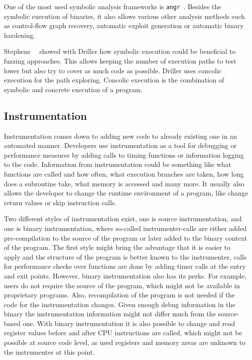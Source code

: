 One of the most used symbolic analysis frameworks is
\texttt{angr}~\cite{angrpaper}. Besides the symbolic execution of binaries, it
also allows various other analysis methods such as control-flow graph recovery,
automatic exploit generation or automatic binary hardening.

Stephens~\etal~\cite{driller} showed with Driller how symbolic execution could
be beneficial to fuzzing approaches. This allows keeping the number of execution
paths to test lower but also try to cover as much code as possible. Driller uses
concolic execution for the path exploring. Concolic execution is the combination
of symbolic and concrete execution of a program.

\subsection{Instrumentation}

Instrumentation comes down to adding new code to already existing one in an
automated manner. Developers use instrumentation as a tool for debugging or
performance measures by adding calls to timing functions or information logging
to the code. Information from instrumentation could be something like what
functions are called and how often, what execution branches are taken, how long
does a subroutine take, what memory is accessed and many more. It usually also
allows the developer to change the runtime environment of a program, like change
return values or skip instruction calls.

Two different styles of instrumentation exist, one is source instrumentation,
and one is binary instrumentation, where so-called instrumenter-calls are either
added pre-compilation to the source of the program or later added to the binary
context of the program. The first style might bring the advantage that it is
easier to apply and the structure of the program is better known to the
instrumenter, calls for performance checks over functions are done by adding
timer calls at the entry and exit points. However, binary instrumentation also
has its perks. For example, users do not require the source of the program,
which might not be available in proprietary programs. Also, recompilation of the
program is not needed if the code for the instrumentation changes. Given enough
debug information in the binary the instrumentation information might not differ
much from the source-based one. With binary instrumentation it is also possible
to change and read register values before and after CPU instructions are called,
which might not be possible at source code level, as used registers and memory
areas are unknown to the instrumenter at this point.

